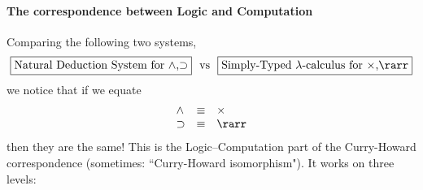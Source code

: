 \documentclass[12pt]{article}
\begin{document}
\paragraph{The correspondence between Logic and Computation} Comparing the following two systems,
\[
  \fbox{Natural Deduction System for $\wedge$,$\supset$}\text{ \ vs \ }
  \fbox{Simply-Typed $\lambda$-calculus for $\times$,$\rarr$}
\]
we notice that if we equate
\[ \begin{array}{lcl}
\wedge & \equiv & \times \\
\supset & \equiv & \rarr
\end{array} \]
then they are the same! This is the Logic--Computation part of the Curry-Howard correspondence (sometimes: ``Curry-Howard isomorphism"). It works on three levels:
\begin{center}
\end{center}
%
%
\end{document}
